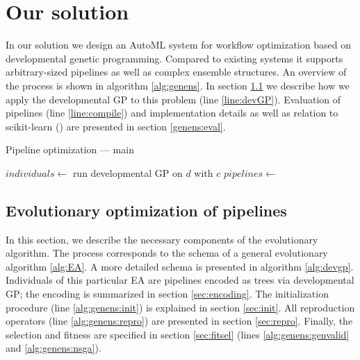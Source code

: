 \chapter{Our solution} \label{our:solution}

In our solution we design an AutoML system for workflow optimization based on
developmental genetic programming. Compared to existing systems it supports 
arbitrary-sized pipelines as well as complex ensemble structures. An overview
of the process is shown in algorithm \ref{alg:genens}. In section
\ref{genens:devGP} we describe how we apply the developmental GP to this
problem (line \ref{line:devGP}). Evaluation of pipelines (line \ref{line:compile})
and implementation details as well as relation to scikit-learn
(\cite{scikit-learn}) are presented in section \ref{genens:eval}.

\begin{algorithm}
\DontPrintSemicolon 
\caption{Pipeline optimization --- main\label{alg:genens}}
  \;
  $individuals \longleftarrow$ run developmental GP on $d$ with $c$ \label{line:devGP} \;
  $pipelines \longleftarrow$  \label{line:compile}
  \;\;
  
\end{algorithm}




\section{Evolutionary optimization of pipelines} \label{genens:devGP}
In this section, we describe the necessary components of the evolutionary algorithm.
The process corresponds to the schema of a general evolutionary algorithm
\ref{alg:EA}. A more detailed schema is presented in algorithm \ref{alg:devgp}.
Individuals of this particular EA are pipelines encoded as trees via
developmental GP; the encoding is summarized in section \ref{sec:encoding}.
The initialization procedure (line \ref{alg:genens:init}) is explained in
section \ref{sec:init}. All reproduction operators
(line \ref{alg:genens:repro}) are presented in section \ref{sec:repro}.
Finally, the selection and fitness are specified in section \ref{sec:fitsel}
(lines \ref{alg:genens:genvalid} and \ref{alg:genens:nsga}).


